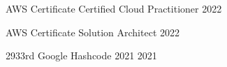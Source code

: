 



\begin{cvhonors}

  \cvhonor
    {AWS Certificate} %
    {Certified Cloud Practitioner} %
    {} %
    {2022} %

  \cvhonor
    {AWS Certificate} %
    {Solution Architect} %
    {} %
    {2022} %

  \cvhonor
    {2933rd} %
    {Google Hashcode 2021} %
    {} %
    {2021} %




\end{cvhonors}





